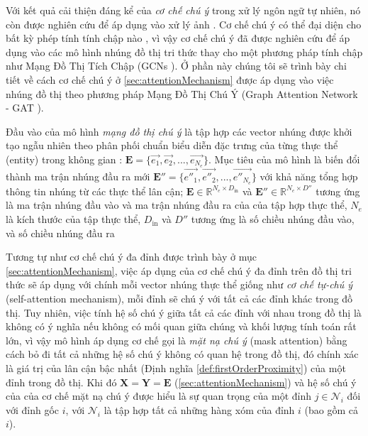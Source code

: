 Với kết quả cải thiện đáng kể của \textit{cơ chế chú ý} trong xử lý ngôn ngữ tự nhiên, nó còn được nghiên cứu để áp dụng vào xử lý ảnh \cite{ramachandran2019stand}. Cơ chế chú ý có thể đại diện cho bất kỳ phép tính tính chập nào \cite{cordonnier2019relationship}, vì vậy cơ chế chú ý đã được nghiên cứu để áp dụng vào các mô hình nhúng đồ thị tri thức thay cho một phương pháp tính chập như Mạng Đồ Thị Tích Chập (GCNs \cite{kipf2016semi}). Ở phần này chúng tôi sẽ trình bày chi tiết về cách cơ chế chú ý ở \ref{sec:attentionMechanism} được áp dụng vào việc nhúng đồ thị theo phương pháp Mạng Đồ Thị Chú Ý (Graph Attention Network - GAT \cite{velivckovic2017graph}).

Đầu vào của mô hình \textit{mạng đồ thị chú ý} là tập hợp các vector nhúng được khởi tạo ngẫu nhiên theo phân phối chuẩn biểu diễn đặc trưng của từng thực thể (entity) trong không gian : $\mathbf{E} = \Big\{\overrightarrow{e_1}, \overrightarrow{e_2}, ...,  \overrightarrow{e_{N_e}}\Big\}$. Mục tiêu của mô hình là biến đổi thành ma trận nhúng đầu ra mới $\mathbf{E}'' = \Big\{\overrightarrow{e''_1}, \overrightarrow{e''_2}, ...,  \overrightarrow{e''_{N_e}}\Big\}$ với khả năng tổng hợp thông tin nhúng từ các thực thể lân cận; $\mathbf{E} \in \mathbb{R}^{N_e \times D_{\text{in}}}$ và $\mathbf{E}'' \in \mathbb{R}^{N_e \times D''}$ tương ứng là ma trận nhúng đầu vào và ma trận nhúng đầu ra của của tập hợp thực thể, $N_e$ là kích thước của tập thực thể, $D_{\text{in}}$ và $D''$ tương ứng là số chiều nhúng đầu vào, và số chiều nhúng đầu ra

Tương tự như cơ chế chú ý đa đỉnh được trình bày ở mục \ref{sec:attentionMechanism}, việc áp dụng của cơ chế chú ý đa đỉnh trên đồ thị tri thức sẽ áp dụng với chính mỗi vector nhúng thực thể giống như \textit{cơ chế tự-chú ý} (self-attention mechanism), mỗi đỉnh sẽ chú ý với tất cả các đỉnh khác trong đồ thị. Tuy nhiên, việc tính hệ số chú ý giữa tất cả các đỉnh với nhau trong đồ thị là không có ý nghĩa nếu không có mối quan giữa chúng và khối lượng tính toán rất lớn, vì vậy mô hình áp dụng cơ chế gọi là \textit{mặt nạ chú ý} (mask attention) bằng cách bỏ đi tất cả những hệ số chú ý không có quan hệ trong đồ thị, đó chính xác là giá trị của lân cận bậc nhất (Định nghĩa \ref{def:firstOrderProximity}) của một đỉnh trong đồ thị. Khi đó $\mathbf{X} = \mathbf{Y} = \mathbf{E}$ (\ref{sec:attentionMechanism}) và hệ số chú ý của của cơ chế mặt nạ chú ý được hiểu là sự quan trọng của một đỉnh $j \in \mathcal{N}_{i}$ đối với đỉnh gốc $i$, với $\mathcal{N}_{i}$ là tập hợp tất cả những hàng xóm của đỉnh $i$ (bao gồm cả $i$). 

